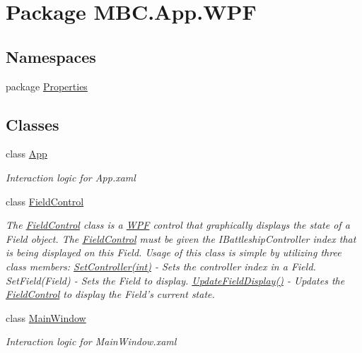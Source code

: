 \hypertarget{namespace_m_b_c_1_1_app_1_1_w_p_f}{\section{Package M\-B\-C.\-App.\-W\-P\-F}
\label{namespace_m_b_c_1_1_app_1_1_w_p_f}
}
\subsection*{Namespaces}
\begin{DoxyCompactItemize}
\item 
package \hyperlink{namespace_m_b_c_1_1_app_1_1_w_p_f_1_1_properties}{Properties}
\end{DoxyCompactItemize}
\subsection*{Classes}
\begin{DoxyCompactItemize}
\item 
class \hyperlink{class_m_b_c_1_1_app_1_1_w_p_f_1_1_app}{App}
\begin{DoxyCompactList}\small\item\em Interaction logic for App.\-xaml \end{DoxyCompactList}\item 
class \hyperlink{class_m_b_c_1_1_app_1_1_w_p_f_1_1_field_control}{Field\-Control}
\begin{DoxyCompactList}\small\item\em The \hyperlink{class_m_b_c_1_1_app_1_1_w_p_f_1_1_field_control}{Field\-Control} class is a \hyperlink{namespace_m_b_c_1_1_app_1_1_w_p_f}{W\-P\-F} control that graphically displays the state of a Field object. The \hyperlink{class_m_b_c_1_1_app_1_1_w_p_f_1_1_field_control}{Field\-Control} must be given the I\-Battleship\-Controller index that is being displayed on this Field. Usage of this class is simple by utilizing three class members\-: \hyperlink{class_m_b_c_1_1_app_1_1_w_p_f_1_1_field_control_abdf9f4f572eb3f9f84caee3b0a9729a1}{Set\-Controller(int)} -\/ Sets the controller index in a Field. Set\-Field(\-Field) -\/ Sets the Field to display. \hyperlink{class_m_b_c_1_1_app_1_1_w_p_f_1_1_field_control_a5f73d69fb63c3fa2e03b145d66f914b6}{Update\-Field\-Display()} -\/ Updates the \hyperlink{class_m_b_c_1_1_app_1_1_w_p_f_1_1_field_control}{Field\-Control} to display the Field's current state. \end{DoxyCompactList}\item 
class \hyperlink{class_m_b_c_1_1_app_1_1_w_p_f_1_1_main_window}{Main\-Window}
\begin{DoxyCompactList}\small\item\em Interaction logic for Main\-Window.\-xaml \end{DoxyCompactList}\end{DoxyCompactItemize}
